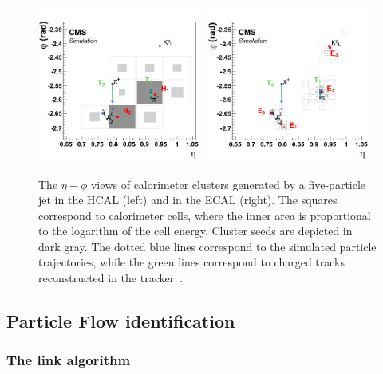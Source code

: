 \begin{figure}[h] 
    \centering
   \includegraphics[width=0.49\textwidth]{figures/event_reconstruction/PF_HCAL.png}
  \includegraphics[width=0.49\textwidth]{figures/event_reconstruction/PF_ECAL.png}
    \caption{The $\eta-\phi$ views of calorimeter clusters generated by a five-particle jet in the HCAL (left) and in the ECAL (right). The squares correspond to calorimeter cells, where the inner area is proportional to the logarithm of the cell energy. Cluster seeds are depicted in dark gray. The dotted blue lines correspond to the simulated particle trajectories, while the green lines correspond to charged tracks reconstructed in the tracker~\cite{1748-0221-12-10-P10003}.}
    \label{fig:objreco:caloclustering}
\end{figure} 


\subsection{Particle Flow identification}

\subsubsection{The link algorithm}

